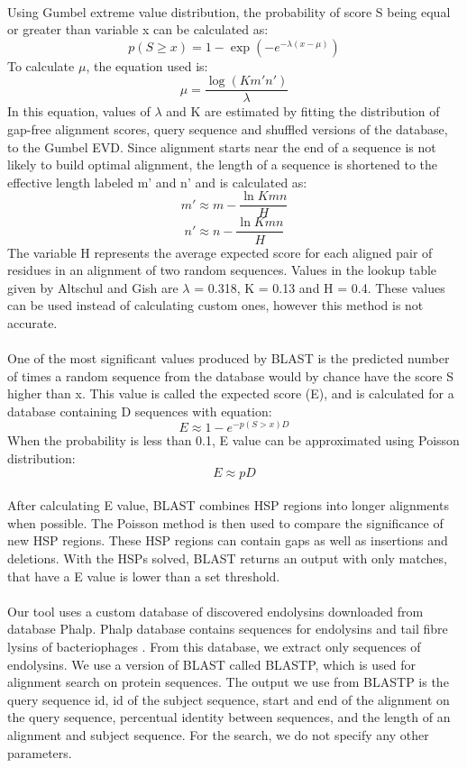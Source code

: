 \paragraph*{}
Using Gumbel extreme value distribution, the probability of score S being equal or greater than variable x can be calculated as:
\[ p(S \geq x) = 1 - \exp(-e^{-\lambda(x-\mu)}) \]
To calculate $\mu$, the equation used is:
\[ \mu = \frac{\log(K m' n')}{\lambda} \]
In this equation, values of $\lambda$ and K are estimated by fitting the distribution of gap-free alignment scores, query sequence and shuffled versions of the database, to the Gumbel EVD. Since alignment starts near the end of a sequence is not likely to build optimal alignment, the length of a sequence is shortened to the effective length labeled m' and n' and is calculated as:
\[ m' \approx m - \frac{\ln K m n}{H} \]
\[n' \approx n - \frac{\ln K m n}{H}\]
The variable H represents the average expected score for each aligned pair of residues in an alignment of two random sequences. Values in the lookup table given by Altschul and Gish are $\lambda$ = 0.318, K = 0.13 and H = 0.4. These values can be used instead of calculating custom ones, however this method is not accurate.
\paragraph*{}
One of the most significant values produced by BLAST is the predicted number of times a random sequence from the database would by chance have the score S higher than x. This value is called the expected score (E), and is calculated for a database containing D sequences with equation:
\[ E \approx 1 - e^{-p(S>x) D} \]
When the probability is less than 0.1, E value can be approximated using Poisson distribution:
\[ E \approx p D \]
\paragraph*{}
After calculating E value, BLAST combines HSP regions into longer alignments when possible. The Poisson method is then used to compare the significance of new HSP regions. These HSP regions can contain gaps as well as insertions and deletions. With the HSPs solved, BLAST returns an output with only matches, that have a E value is lower than a set threshold.
\paragraph*{}
Our tool uses a custom database of discovered endolysins downloaded from database Phalp. Phalp database contains sequences for endolysins and tail fibre lysins of bacteriophages \cite{criel2021phalp}. From this database, we extract only sequences of endolysins. We use a version of BLAST called BLASTP, which is used for alignment search on protein sequences. The output we use from BLASTP is the query sequence id, id of the subject sequence, start and end of the alignment on the query sequence, percentual identity between sequences, and the length of an alignment and subject sequence. For the search, we do not specify any other parameters.

